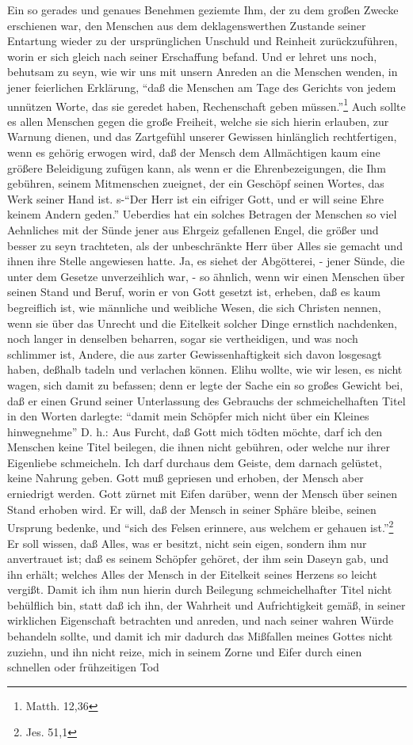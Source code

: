 Ein so gerades und genaues Benehmen geziemte Ihm, der zu dem großen Zwecke erschienen war, den Menschen aus dem deklagenswerthen Zustande seiner Entartung wieder zu der ursprünglichen Unschuld und Reinheit zurückzuführen, worin er sich gleich nach seiner Erschaffung befand. Und er lehret uns noch, behutsam zu seyn, wie wir uns mit unsern Anreden an die Menschen wenden, in jener feierlichen Erklärung, "`daß die Menschen am Tage des Gerichts von jedem unnützen Worte, das sie geredet haben, Rechenschaft geben müssen."'\footnote{Matth. 12,36} Auch sollte es allen Menschen gegen die große Freiheit, welche sie sich hierin erlauben, zur Warnung dienen, und das Zartgefühl unserer Gewissen hinlänglich rechtfertigen, wenn es gehörig erwogen wird, daß der Mensch dem Allmächtigen kaum eine größere Beleidigung zufügen kann, als wenn er die Ehrenbezeigungen, die Ihm gebühren, seinem Mitmenschen zueignet, der ein Geschöpf seinen Wortes, das Werk seiner Hand ist. s-"`Der Herr ist ein eifriger Gott, und er will seine Ehre keinem Andern geden."' Ueberdies hat ein solches Betragen der Menschen so viel Aehnliches mit der Sünde jener aus Ehrgeiz gefallenen Engel, die größer und besser zu seyn trachteten, als der unbeschränkte Herr über Alles sie gemacht und ihnen ihre Stelle angewiesen hatte. Ja, es siehet der Abgötterei, - jener Sünde, die unter dem Gesetze unverzeihlich war, - so ähnlich, wenn wir einen Menschen über seinen Stand und Beruf, worin er von Gott gesetzt ist, erheben, daß es kaum begreiflich ist, wie männliche und weibliche Wesen, die sich Christen nennen, wenn sie über das Unrecht und die Eitelkeit solcher Dinge ernstlich nachdenken, noch langer in denselben beharren, sogar sie vertheidigen, und was noch schlimmer ist, Andere, die aus zarter Gewissenhaftigkeit sich davon losgesagt haben, deßhalb tadeln und verlachen können. Elihu wollte, wie wir lesen, es nicht wagen, sich damit zu befassen; denn er legte der Sache ein so großes Gewicht bei, daß er einen Grund seiner Unterlassung des Gebrauchs der schmeichelhaften Titel in den Worten darlegte: "`damit mein Schöpfer mich nicht über ein Kleines hinwegnehme"' D. h.: Aus Furcht, daß Gott mich tödten möchte, darf ich den Menschen keine Titel beilegen, die ihnen nicht gebühren, oder welche nur ihrer Eigenliebe schmeicheln. Ich darf durchaus dem Geiste, dem darnach gelüstet, keine Nahrung geben. Gott muß gepriesen und erhoben, der Mensch aber erniedrigt werden. Gott zürnet mit Eifen darüber, wenn der Mensch über seinen Stand erhoben wird. Er will, daß der Mensch in seiner Sphäre bleibe, seinen Ursprung bedenke, und "`sich des Felsen erinnere, aus welchem er gehauen ist."'\footnote{Jes. 51,1} Er soll wissen, daß Alles, was er besitzt, nicht sein eigen, sondern ihm nur anvertrauet ist; daß es seinem Schöpfer gehöret, der ihm sein Daseyn gab, und ihn erhält; welches Alles der Mensch in der Eitelkeit seines Herzens so leicht vergißt. Damit ich ihm nun hierin durch Beilegung schmeichelhafter Titel nicht behülflich bin, statt daß ich ihn, der Wahrheit und Aufrichtigkeit gemäß, in seiner wirklichen Eigenschaft betrachten und anreden, und nach seiner wahren Würde behandeln sollte, und damit ich mir dadurch das Mißfallen meines Gottes nicht zuziehn, und ihn nicht reize, mich in seinem Zorne und Eifer durch einen schnellen oder frühzeitigen Tod 